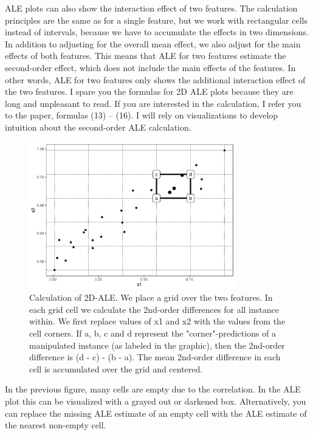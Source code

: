 \documentclass[
  11pt,
]{scrbook}
\begin{document}
ALE plots can also show the interaction effect of two features.
The calculation principles are the same as for a single feature, but we work with rectangular cells instead of intervals, because we have to accumulate the effects in two dimensions.
In addition to adjusting for the overall mean effect, we also adjust for the main effects of both features.
This means that ALE for two features estimate the second-order effect, which does not include the main effects of the features.
In other words, ALE for two features only shows the additional interaction effect of the two features.
I spare you the formulas for 2D ALE plots because they are long and unpleasant to read.
If you are interested in the calculation, I refer you to the paper, formulas (13) -- (16).
I will rely on visualizations to develop intuition about the second-order ALE calculation.

\begin{figure}

{\centering \includegraphics[width=0.8\textwidth]{images/aleplot-computation-2d-1} 

}

\caption{Calculation of 2D-ALE. We place a grid over the two features. In each grid cell we calculate the 2nd-order differences for all instance within. We first replace values of x1 and x2 with the values from the cell corners. If a, b, c and d represent the "corner"-predictions of a manipulated instance (as labeled in the graphic), then the 2nd-order difference is (d - c) - (b - a). The mean 2nd-order difference in each cell is accumulated over the grid and centered.}\label{fig:aleplot-computation-2d}
\end{figure}

In the previous figure, many cells are empty due to the correlation.
In the ALE plot this can be visualized with a grayed out or darkened box.
Alternatively, you can replace the missing ALE estimate of an empty cell with the ALE estimate of the nearest non-empty cell.
\end{document}
